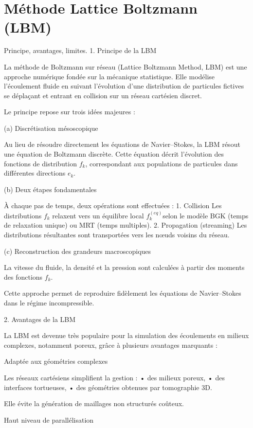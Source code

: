 \documentclass[12pt,a4paper]{report}
\begin{document}
\section{Méthode Lattice Boltzmann (LBM)}
Principe, avantages, limites.
1. Principe de la LBM

La méthode de Boltzmann sur réseau (Lattice Boltzmann Method, LBM) est une approche numérique fondée sur la mécanique statistique.
Elle modélise l’écoulement fluide en suivant l’évolution d’une distribution de particules fictives se déplaçant et entrant en collision sur un réseau cartésien discret.

Le principe repose sur trois idées majeures :

(a) Discrétisation mésoscopique

Au lieu de résoudre directement les équations de Navier–Stokes, la LBM résout une équation de Boltzmann discrète.
Cette équation décrit l’évolution des fonctions de distribution $f_k$, correspondant aux populations de particules dans différentes directions $e_k$.

(b) Deux étapes fondamentales

À chaque pas de temps, deux opérations sont effectuées :
	1.	Collision
Les distributions $f_k$ relaxent vers un équilibre local $f_k^{(eq)} $selon le modèle BGK (temps de relaxation unique) ou MRT (temps multiples).
	2.	Propagation (streaming)
Les distributions résultantes sont transportées vers les nœuds voisins du réseau.

(c) Reconstruction des grandeurs macroscopiques

La vitesse du fluide, la densité et la pression sont calculées à partir des moments des fonctions $f_k$.

Cette approche permet de reproduire fidèlement les équations de Navier–Stokes dans le régime incompressible.



2. Avantages de la LBM

La LBM est devenue très populaire pour la simulation des écoulements en milieux complexes, notamment poreux, grâce à plusieurs avantages marquants :

 Adaptée aux géométries complexes

Les réseaux cartésiens simplifient la gestion :
	•	des milieux poreux,
	•	des interfaces tortueuses,
	•	des géométries obtenues par tomographie 3D.

Elle évite la génération de maillages non structurés coûteux.

Haut niveau de parallélisation
\end{document}

